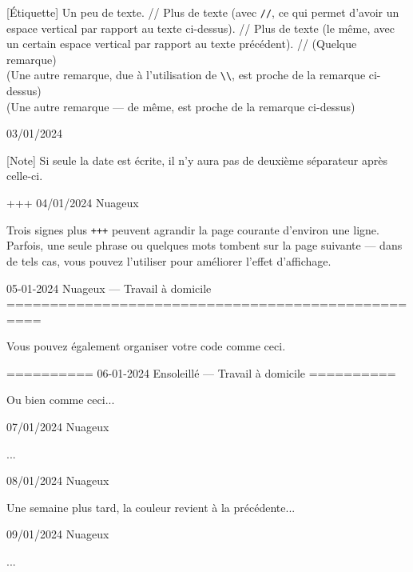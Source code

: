 \documentclass[11pt, paperstyle=light yellow, color entry, day-month-year,
  title in boldface, title in sffamily, use style = classical]{jwjournal}
\begin{document}
  [Étiquette] Un peu de texte.
    //
    Plus de texte (avec \texttt{\slash\slash}, ce qui permet d'avoir un espace vertical par rapport au texte ci-dessus).
    //
    Plus de texte (le même, avec un certain espace vertical par rapport au texte précédent).
    //
    (Quelque remarque)
    \\
    (Une autre remarque, due à l'utilisation de \texttt{\textbackslash\textbackslash}, est proche de la remarque ci-dessus)
    \\
    (Une autre remarque --- de même, est proche de la remarque ci-dessus)



03/01/2024

  [Note] Si seule la date est écrite, il n'y aura pas de deuxième séparateur après celle-ci.


+++
04/01/2024  Nuageux

  Trois signes plus \texttt{+++} peuvent agrandir la page courante d'environ une ligne. Parfois, une seule phrase ou quelques mots tombent sur la page suivante --- dans de tels cas, vous pouvez l'utiliser pour améliorer l'effet d'affichage.



05-01-2024    Nuageux       --- Travail à domicile
==================================================

Vous pouvez également organiser votre code comme ceci.


==========
06-01-2024    Ensoleillé    --- Travail à domicile
==========

Ou bien comme ceci...



07/01/2024  Nuageux

  ...



08/01/2024  Nuageux

  Une semaine plus tard, la couleur revient à la précédente...



09/01/2024  Nuageux

  ...
\end{document}
